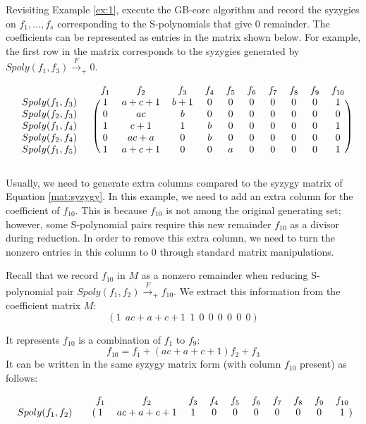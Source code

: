  \begin{Example}
 Revisiting Example \ref{ex:1}, execute the GB-core algorithm and
 record the syzygies on $f_1,\dots,f_s$ corresponding to the
 S-polynomials that give 0 remainder. The coefficients can be
 represented as entries in the matrix shown below. For example, the first
 row in the matrix corresponds to the syzygies generated by
 $Spoly(f_1,f_3)\xrightarrow{F}_+0$.  

\begin{equation}\label{eqn:sm}
 \begin{blockarray}{cccccccccccc}
  && f_1 & f_2 & f_3 & f_4 & f_5 & f_6 & f_7 & f_8 & f_9 & f_{10} \\
  \begin{block}{cc(cccccccccc)}
  Spoly(f_1,f_3)\ & & 1 & a+c+1 & b+1 &0&0&0&0&0&0&1\\
  Spoly(f_2,f_3)\ & & 0 & ac & b &0&0&0&0&0&0&0\\
  Spoly(f_1,f_4)\ & & 1 & c+1 & 1 &b&0&0&0&0&0&1\\
  Spoly(f_2,f_4)\ & & 0 & ac+a & 0 &b&0&0&0&0&0&0\\
  Spoly(f_1,f_5)\ & & 1 & a+c+1 & 0 &0&a&0&0&0&0&1\\
  \end{block}
  \end{blockarray}
\end{equation}

Usually, we need to generate extra columns compared to the syzygy
matrix of Equation \ref{mat:syzygy}. In this example, we need to add an
extra column for the coefficient of $f_{10}$. This is because $f_{10}$
is not among the original generating set; however, some S-polynomial
pairs require this new remainder $f_{10}$ as a divisor during
reduction. In order to remove this extra column, we need to turn the
nonzero entries in this column to 0 through standard matrix
manipulations. 

Recall that we record $f_{10}$ in $M$ as a nonzero remainder when
reducing S-polynomial pair $Spoly(f_1,f_2)\xrightarrow{F}_+f_{10}$. We
extract this information from the coefficient matrix $M$:
 $$(1 ~~ac+a+c+1 ~~1 ~~0 ~~0 ~~0 ~~0 ~~0 ~~0 )$$

 It represents $f_{10}$ is a combination of $f_1$ to $f_9$:
 $$f_{10} = f_1 + (ac+a+c+1)f_2 + f_3$$
 It can be written in the same syzygy matrix form (with column
 $f_{10}$ present) as follows:

\begin{equation}\label{sr}%
 \begin{blockarray}{cccccccccccc}
  && f_1 & f_2 & f_3 & f_4 & f_5 & f_6 & f_7 & f_8 & f_9 & f_{10} \\
  \begin{block}{cc(cccccccccc)}
  Spoly(f_1,f_2)& & 1 & ac+a+c+1 & 1 &0&0&0&0&0&0&1\\
  \end{block}
  \end{blockarray}
 \end{equation}


\end{Example}
